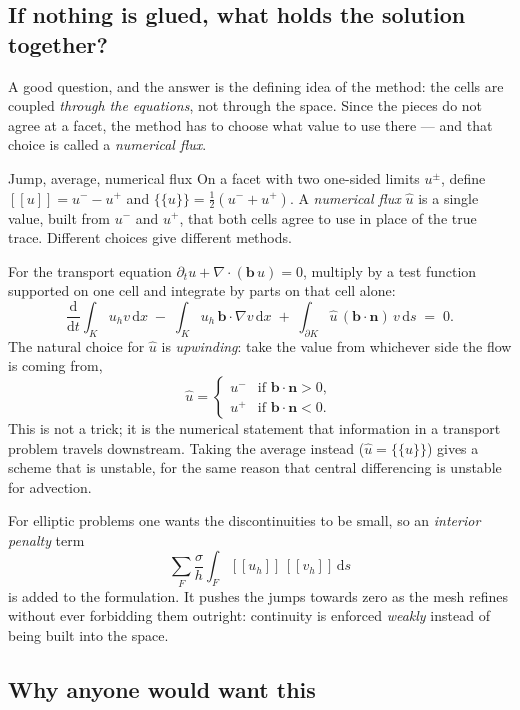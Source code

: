 \documentclass[11pt,a4paper]{article}
\newcommand{\jump}[1]{[\![#1]\!]}
\newcommand{\avg}[1]{\{\!\{#1\}\!\}}
\newcommand{\dx}{\,\mathrm{d}x}
\newcommand{\ds}{\,\mathrm{d}s}
\newcommand{\bn}{\mathbf{n}}
\begin{document}
\subsection{If nothing is glued, what holds the solution together?}

A good question, and the answer is the defining idea of the method: the cells
are coupled \emph{through the equations}, not through the space. Since the
pieces do not agree at a facet, the method has to choose what value to use
there --- and that choice is called a \emph{numerical flux}.

\begin{jargon}{Jump, average, numerical flux}
On a facet with two one-sided limits $u^\pm$, define
$\jump{u} = u^- - u^+$ and $\avg{u} = \tfrac12(u^- + u^+)$.
A \emph{numerical flux} $\hat{u}$ is a single value, built from $u^-$ and $u^+$,
that both cells agree to use in place of the true trace. Different choices give
different methods.
\end{jargon}

For the transport equation $\partial_t u + \nabla\cdot(\mathbf{b}\,u) = 0$,
multiply by a test function supported on one cell and integrate by parts on
that cell alone:
\[
  \frac{\mathrm{d}}{\mathrm{d}t}\int_K u_h v \dx
  \;-\; \int_K u_h\, \mathbf{b}\cdot\nabla v \dx
  \;+\; \int_{\partial K} \hat{u}\, (\mathbf{b}\cdot\bn)\, v \ds \;=\; 0 .
\]
The natural choice for $\hat u$ is \emph{upwinding}: take the value from
whichever side the flow is coming from,
\[
  \hat u = \begin{cases} u^- & \text{if } \mathbf{b}\cdot\bn > 0,\\
                         u^+ & \text{if } \mathbf{b}\cdot\bn < 0.\end{cases}
\]
This is not a trick; it is the numerical statement that information in a
transport problem travels downstream. Taking the average instead
($\hat u = \avg{u}$) gives a scheme that is unstable, for the same reason that
central differencing is unstable for advection.

For elliptic problems one wants the discontinuities to be small, so an
\emph{interior penalty} term
\[
  \sum_{F} \frac{\sigma}{h} \int_F \jump{u_h}\, \jump{v_h} \ds
\]
is added to the formulation. It pushes the jumps towards zero as the mesh
refines without ever forbidding them outright: continuity is enforced
\emph{weakly} instead of being built into the space.

\subsection{Why anyone would want this}
\end{document}
